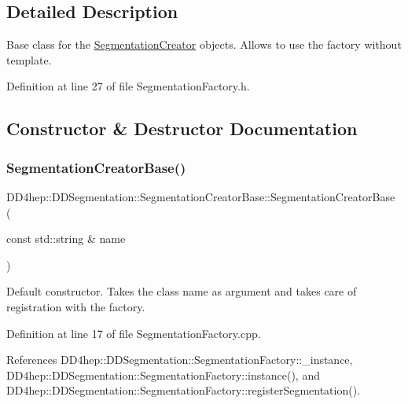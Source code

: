 \subsection{Detailed Description}
Base class for the \hyperlink{class_d_d4hep_1_1_d_d_segmentation_1_1_segmentation_creator}{Segmentation\+Creator} objects. Allows to use the factory without template. 

Definition at line 27 of file Segmentation\+Factory.\+h.



\subsection{Constructor \& Destructor Documentation}
\hypertarget{class_d_d4hep_1_1_d_d_segmentation_1_1_segmentation_creator_base_aaea0ce7f18f4a00718586fde3b214aaa}{}\label{class_d_d4hep_1_1_d_d_segmentation_1_1_segmentation_creator_base_aaea0ce7f18f4a00718586fde3b214aaa} 
\subsubsection{\texorpdfstring{Segmentation\+Creator\+Base()}{SegmentationCreatorBase()}}
{\footnotesize\ttfamily D\+D4hep\+::\+D\+D\+Segmentation\+::\+Segmentation\+Creator\+Base\+::\+Segmentation\+Creator\+Base (\begin{DoxyParamCaption}\item[{const std\+::string \&}]{name }\end{DoxyParamCaption})}



Default constructor. Takes the class name as argument and takes care of registration with the factory. 



Definition at line 17 of file Segmentation\+Factory.\+cpp.



References D\+D4hep\+::\+D\+D\+Segmentation\+::\+Segmentation\+Factory\+::\+\_\+instance, D\+D4hep\+::\+D\+D\+Segmentation\+::\+Segmentation\+Factory\+::instance(), and D\+D4hep\+::\+D\+D\+Segmentation\+::\+Segmentation\+Factory\+::register\+Segmentation().

